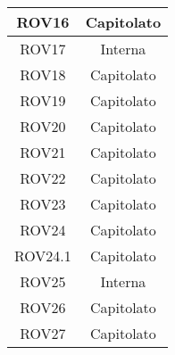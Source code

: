 \begin{longtable}{|c|c|}
\midrule
ROV16
& Capitolato\\

\midrule
ROV17
& Interna\\

\midrule
ROV18
& Capitolato\\

\midrule
ROV19
& Capitolato\\

\midrule
ROV20
& Capitolato\\

\midrule
ROV21
& Capitolato\\

\midrule
ROV22
& Capitolato\\

\midrule
ROV23
& Capitolato\\

\midrule
ROV24
& Capitolato\\

\midrule
ROV24.1
& Capitolato\\

\midrule
ROV25
& Interna\\

\midrule
ROV26
& Capitolato\\

\midrule
ROV27
& Capitolato\\





\end{longtable}

\newpage
